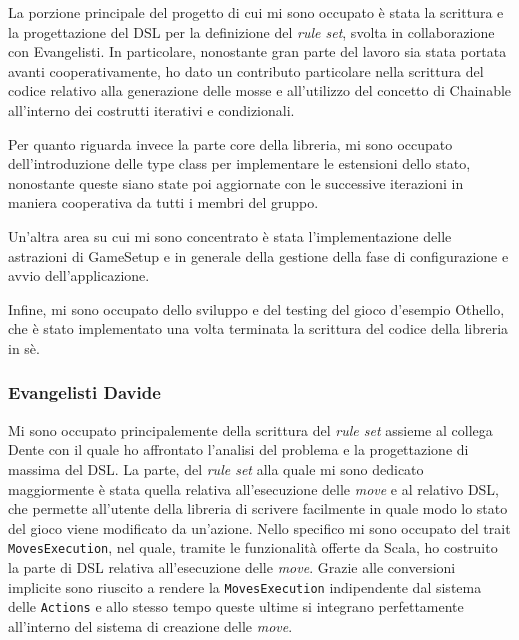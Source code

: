 La porzione principale del progetto di cui mi sono occupato è stata la scrittura e la progettazione del DSL per la definizione del \textit{rule set}, svolta in collaborazione con Evangelisti.
%
In particolare, nonostante gran parte del lavoro sia stata portata avanti cooperativamente, ho dato un contributo particolare nella scrittura del codice relativo alla generazione delle mosse e all'utilizzo del concetto di Chainable all'interno dei costrutti iterativi e condizionali.

Per quanto riguarda invece la parte core della libreria, mi sono occupato dell'introduzione delle type class per implementare le estensioni dello stato, nonostante queste siano state poi aggiornate con le successive iterazioni in maniera cooperativa da tutti i membri del gruppo.

Un'altra area su cui mi sono concentrato è stata l'implementazione delle astrazioni di GameSetup e in generale della gestione della fase di configurazione e avvio dell'applicazione.

Infine, mi sono occupato dello sviluppo e del testing del gioco d'esempio Othello, che è stato implementato una volta terminata la scrittura del codice della libreria in sè.

\subsubsection{Evangelisti Davide}
Mi sono occupato principalemente della scrittura del \textit{rule set} assieme al collega Dente con il quale ho affrontato l'analisi del problema e la progettazione di massima del DSL.
%
La parte, del \textit{rule set} alla quale mi sono dedicato maggiormente è stata quella relativa all'esecuzione delle \textit{move} e al relativo DSL, che permette all'utente della libreria di scrivere facilmente in quale modo lo stato del gioco viene modificato da un'azione.
%
Nello specifico mi sono occupato del trait \texttt{MovesExecution}, nel quale, tramite le funzionalità offerte da Scala, ho costruito la parte di DSL relativa all'esecuzione delle \textit{move}.
%
Grazie alle conversioni implicite sono riuscito a rendere la \texttt{MovesExecution} indipendente dal sistema delle \texttt{Actions} e allo stesso tempo queste ultime si integrano perfettamente all'interno del sistema di creazione delle \textit{move}.

